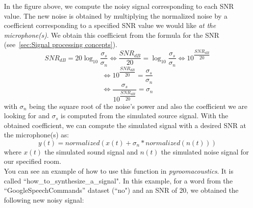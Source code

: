 \documentclass[11pt,a4paper,titlepage]{report}
\begin{document}
In the figure above, we compute the noisy signal corresponding to each SNR value. The new noise is obtained by multiplying the normalized noise by a coefficient corresponding to a specified SNR value we would like \emph{at the microphone(s)}. We obtain this coefficient from the formula for the SNR (see~\ref{sec:Signal processing concepts}).
\begin{equation}
SNR_{dB} = 20\log_{10}{\dfrac{\sigma_{s}}{\sigma_{n}}} \Leftrightarrow \dfrac{SNR_{dB}}{20} = \log_{10}{\dfrac{\sigma_{s}}{\sigma_{n}}} \Leftrightarrow 10^{\dfrac{SNR_{dB}}{20}}
\end{equation}
\begin{equation}
\Leftrightarrow 10^{\dfrac{SNR_{dB}}{20}} = \dfrac{\sigma_{s}}{\sigma_{n}}
\end{equation}
\begin{equation}
\Leftrightarrow \dfrac{\sigma_{s}}{10^{\dfrac{SNR_{dB}}{20}}} = \sigma_{n}
\end{equation}
with $\sigma_{n}$ being the square root of the noise's power and also the coefficient we are looking for and $\sigma_{s}$ is computed from the simulated source signal. With the obtained coefficient, we can compute the simulated signal with a desired SNR at the microphone(s) as:
\begin{equation}
y(t) = normalized(x(t) + \sigma_{n} * normalized(n(t)) )
\end{equation}
where $ x(t) $ the simulated sound signal and $ n(t) $ the simulated noise signal for our specified room.\\
\hspace*{0.6cm}
You can see an example of how to use this function in \textit{pyroomacoustics}. It is called ``how\_to\_synthesize\_a\_signal". In this example, for a word from the ``GoogleSpeechCommands'' dataset (``no") and an SNR of 20, we obtained the following new noisy signal:
\end{document}
